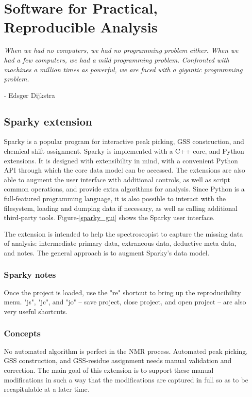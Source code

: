 \chapter{Software for Practical, Reproducible Analysis}

\begin{center}
  \textit{When we had no computers, we had no programming problem either. 
    When we had a few computers, we had a mild programming problem. Confronted 
    with machines a million times as powerful, we are faced with a gigantic 
    programming problem.}

 - Edsger Dijkstra
\end{center}

\section{Sparky extension}

Sparky \cite{sparky} is a popular program for interactive peak picking,
GSS construction, and chemical shift assignment.  Sparky is implemented 
with a C++ core, and Python extensions.  It is designed with
extensibility in mind, with a convenient Python API through which 
the core data model can be accessed.  The
extensions are also able to augment the user interface with additional
controls, as well as script common operations, and provide extra algorithms
for analysis.  Since Python is a full-featured programming language, 
it is also possible to interact with the filesystem, loading and dumping
data if necessary, as well as calling additional third-party tools.
Figure-\ref{sparky_gui} shows the Sparky user interface.

The extension is intended to help the spectroscopist to capture the 
missing data of analysis: intermediate primary data, extraneous
data, deductive meta data, and notes.  The general approach is to augment
Sparky's data model.

\subsection{Sparky notes}
Once the project is loaded, use the "re" shortcut to bring up the 
reproducibility menu.  "js", "jc", and "jo" -- save project, close project,
and open project -- are also very useful shortcuts.

\subsection{Concepts}
No automated algorithm is perfect in the NMR process.  Automated peak picking,
GSS construction, and GSS-residue assignment needs manual validation and
correction.  The main goal of this extension is to support these manual
modifications in such a way that the modifications are captured in full so
as to be recapitulable at a later time.

